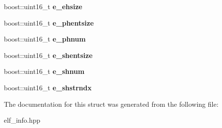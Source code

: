 \begin{DoxyCompactItemize}
\item 
boost\+::uint16\+\_\+t {\bfseries e\+\_\+ehsize}\hypertarget{a00085_aa3887c3b940f630dbb78807f8cc81c82}{}\label{a00085_aa3887c3b940f630dbb78807f8cc81c82}

\item 
boost\+::uint16\+\_\+t {\bfseries e\+\_\+phentsize}\hypertarget{a00085_aae8978ff0f2a20896b3c1ed34dc0793e}{}\label{a00085_aae8978ff0f2a20896b3c1ed34dc0793e}

\item 
boost\+::uint16\+\_\+t {\bfseries e\+\_\+phnum}\hypertarget{a00085_af1962363e104e15e4635066806e52a00}{}\label{a00085_af1962363e104e15e4635066806e52a00}

\item 
boost\+::uint16\+\_\+t {\bfseries e\+\_\+shentsize}\hypertarget{a00085_a9d22ea8279a4c31365059d2ebe3bac56}{}\label{a00085_a9d22ea8279a4c31365059d2ebe3bac56}

\item 
boost\+::uint16\+\_\+t {\bfseries e\+\_\+shnum}\hypertarget{a00085_a610b772eda5456c9a9ab83537caef750}{}\label{a00085_a610b772eda5456c9a9ab83537caef750}

\item 
boost\+::uint16\+\_\+t {\bfseries e\+\_\+shstrndx}\hypertarget{a00085_acae2be4b1e8d9766b5f9aaf32d5e7ca4}{}\label{a00085_acae2be4b1e8d9766b5f9aaf32d5e7ca4}

\end{DoxyCompactItemize}


The documentation for this struct was generated from the following file\+:\begin{DoxyCompactItemize}
\item 
elf\+\_\+info.\+hpp\end{DoxyCompactItemize}
